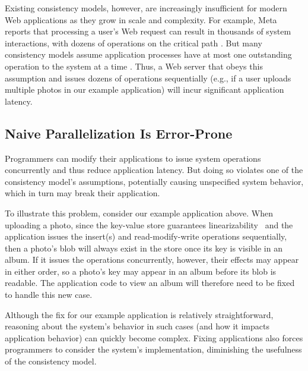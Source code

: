
Existing consistency models, however, are increasingly insufficient for modern Web applications as they grow in scale and complexity. For example, Meta reports that processing a user's Web request can result in thousands of system interactions, with dozens of operations on the critical path \cite{ajoux2015challenges}. But many consistency models assume application processes have at most one outstanding operation to the system at a time \cite{ahamad1995causal,herlihy1990linearizability}. Thus, a Web server that obeys this assumption and issues dozens of operations sequentially
(e.g., if a user uploads multiple photos in our example application)
will incur significant application latency.


\subsection{Naive Parallelization Is Error-Prone}

Programmers can modify their applications to issue system operations concurrently
and thus reduce application latency. But doing so violates one of the consistency
model’s assumptions, potentially causing unspecified system behavior,
which in turn may break their application.

To illustrate this problem, consider our example application above.
When uploading a photo, since the key-value store guarantees
linearizability~\cite{herlihy1990linearizability} and the application issues the
insert(s) and read-modify-write operations sequentially, then a photo’s blob will
always exist in the store once its key is visible in an album.
If it issues the operations concurrently, however, their effects may appear in either order,
so a photo’s key may appear in an album before its blob is readable.
The application code to view an album will therefore need to be fixed to handle this new case.

Although the fix for our example application is relatively straightforward,
reasoning about the system’s behavior in such cases (and how it impacts application behavior)
can quickly become complex.
Fixing applications also forces programmers to consider the system’s implementation,
diminishing the usefulness of the consistency model.

